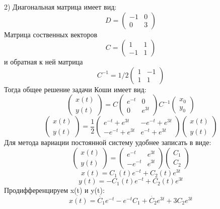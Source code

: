 \documentclass[10pt]{report}
\begin{document}
2) Диагональная матрица имеет вид:
\[D=\left(
\begin{array}{cc}
-1 & 0\\
0 & 3
\end{array}\right)\]
Матрица соственных векторов
\[C=\left(
\begin{array}{cc}
1 & 1\\
-1 & 1
\end{array}\right)\]
и обратная к ней матрица
\[C^{-1}=1/2\left(
\begin{array}{cc}
1 & -1\\
1 & 1
\end{array}\right)\]
Тогда общее решение задачи Коши имеет вид:
\[\left(
\begin{array}{c}
x(t)\\
y(t)
\end{array}\right)=C
\left(
\begin{array}{cc}
e^{-t} & 0\\
0 & e^{3t}
\end{array}\right)C^{-1}
\left(
\begin{array}{c}
x_0\\
y_0
\end{array}\right)\]
\[\left(
\begin{array}{c}
x(t)\\
y(t)
\end{array}\right)= \frac 1 2
\left(
\begin{array}{cc}
e^{-t}+e^{3t} & -e^{-t}+e^{3t}\\
-e^{-t}+e^{3t} & e^{-t}+e^{3t}
\end{array}\right)
\left(
\begin{array}{c}
x(t)\\
y(t)
\end{array}\right)\]
Для метода вариации постоянной систему удобнее записать в виде:
\[\left(
\begin{array}{c}
x(t)\\
y(t)
\end{array}\right)=
\left(
\begin{array}{cc}
e^{-t} & e^{3t}\\
-e^{-t} & e^{3t}
\end{array}\right)\left(
\begin{array}{c}
C_1\\
C_2
\end{array}\right)\]
\[x(t)=C_1(t)e^{-t}+C_2(t)e^{3t}\]
\[y(t)=-C_1(t)e^{-t}+C_2(t)e^{3t}\]
Продифференцируем x(t) и y(t):
\[\dot{x(t)}=\dot{C_1}e^{-t}-e^{-t}C_1+\dot{C_2}e^{3t}+3C_2e^{3t}\]
\end{document}
